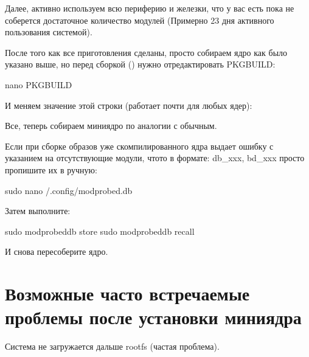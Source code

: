 \documentclass[letterpaper,10pt,russian,openany]{sphinxmanual}
\begin{document}
\sphinxAtStartPar
Далее, активно используем всю периферию и железки, что у вас есть пока не соберется достаточное количество модулей (Примерно 2\sphinxhyphen{}3 дня активного пользования системой).

\sphinxAtStartPar
После того как все приготовления сделаны, просто собираем ядро как было указано выше, но перед сборкой () нужно отредактировать PKGBUILD:

\begin{sphinxVerbatim}[commandchars=\\\{\}]
nano PKGBUILD
\end{sphinxVerbatim}

\sphinxAtStartPar
И меняем значение этой строки (работает почти для любых ядер): 

\sphinxAtStartPar
Все, теперь собираем мини\sphinxhyphen{}ядро по аналогии с обычным.

\sphinxAtStartPar
{} Если при сборке образов уже скомпилированного ядра выдает ошибку с указанием на отсутствующие модули, что\sphinxhyphen{}то в формате: db\_xxx, bd\_xxx \sphinxhyphen{} просто пропишите их в ручную:

\begin{sphinxVerbatim}[commandchars=\\\{\}]
sudo nano \PYGZti{}/.config/modprobed.db
\end{sphinxVerbatim}

\sphinxAtStartPar
Затем выполните:

\begin{sphinxVerbatim}[commandchars=\\\{\}]
sudo modprobed\PYGZhy{}db store
sudo modprobed\PYGZhy{}db recall
\end{sphinxVerbatim}

\sphinxAtStartPar
И снова пересоберите ядро.

\sphinxAtStartPar
{}

\sphinxAtStartPar
{}

\ignorespaces 

\section{Возможные часто встречаемые проблемы после установки мини\sphinxhyphen{}ядра}
\label{\detokenize{source/mini-kernel:related-issues}}\label{\detokenize{source/mini-kernel:index-1}}\label{\detokenize{source/mini-kernel:id3}}
\sphinxAtStartPar
{} Система не загружается дальше rootfs (частая проблема).
\end{document}

